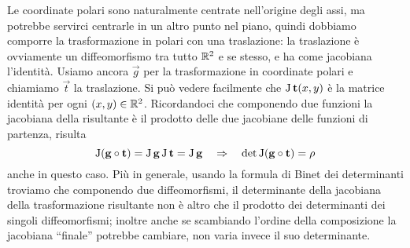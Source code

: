 Le coordinate polari sono naturalmente centrate nell'origine degli assi, ma potrebbe servirci centrarle in un altro punto nel piano, quindi dobbiamo comporre la trasformazione in polari con una traslazione: la traslazione è ovviamente un diffeomorfismo tra tutto $\mathbb{R}^2$ e se stesso, e ha come jacobiana l'identità.
Usiamo ancora $\vec g$ per la trasformazione in coordinate polari e chiamiamo $\vec t$ la traslazione.
Si può vedere facilmente che $\operatorname{J}\mathbf{t}(x,y)$ è la matrice identità per ogni $(x,y)\in\mathbb{R}^2$.
Ricordandoci che componendo due funzioni la jacobiana della risultante è il prodotto delle due jacobiane delle funzioni di partenza, risulta
\begin{equation}
	\operatorname{J}(\mathbf{g}\circ\mathbf{t})=\operatorname{J}\mathbf{g}\operatorname{J}\mathbf{t}=\operatorname{J}\mathbf{g}\quad\Rightarrow\quad\det\operatorname{J}(\mathbf{g}\circ\mathbf{t})=\rho
\end{equation}
anche in questo caso.
Più in generale, usando la formula di Binet dei determinanti troviamo che componendo due diffeomorfismi, il determinante della jacobiana della trasformazione risultante non è altro che il prodotto dei determinanti dei singoli diffeomorfismi; inoltre anche se scambiando l'ordine della composizione la jacobiana ``finale'' potrebbe cambiare, non varia invece il suo determinante.
